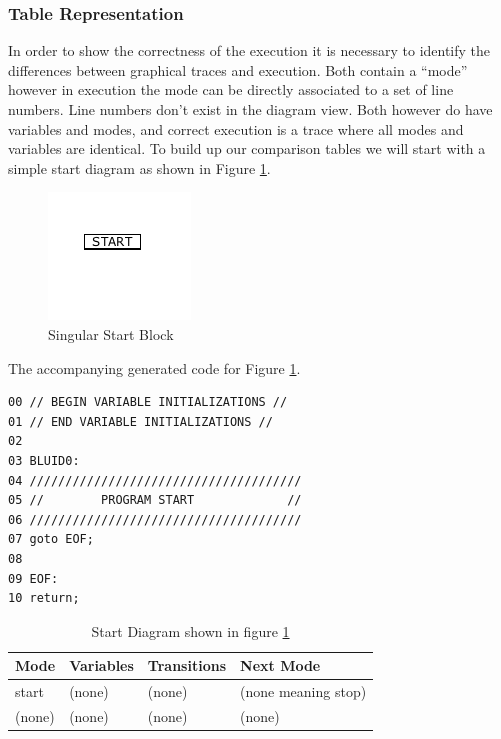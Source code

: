 \subsubsection{Table Representation}

In order to show the correctness of the execution it is necessary to identify the differences between graphical traces and execution. Both contain a ``mode'' however in execution the mode can be directly associated to a set of line numbers. Line numbers don't exist in the diagram view. Both however do have variables and modes, and correct execution is a trace where all modes and variables are identical. To build up our comparison tables we will start with a simple start diagram as shown in Figure \ref{fig:correctness_ex_start}.

\begin{figure}[h]
	\centering
	\includegraphics[width=\imgsmall]{./images/correctness_ex_start.png}
	\caption{Singular Start Block}
	\label{fig:correctness_ex_start}
\end{figure}


The accompanying generated  code for Figure \ref{fig:correctness_ex_start}.

\begin{lstlisting}[frame=single]
00 // BEGIN VARIABLE INITIALIZATIONS //
01 // END VARIABLE INITIALIZATIONS //
02
03 BLUID0:
04 //////////////////////////////////////
05 //        PROGRAM START             //
06 //////////////////////////////////////
07 goto EOF;
08 
09 EOF:
10 return;
\end{lstlisting}

\begin{table}[htcb]
	\caption{Start Diagram shown in figure \ref{fig:correctness_ex_start}}
	\centering
		\begin{tabular}{| l | l | l | l |}
			\hline
			\textbf{Mode} & \textbf{Variables} & \textbf{Transitions} & \textbf{Next Mode} \\
			\hline
			start & (none) & (none) & (none meaning stop) \\
			\hline
			(none) & (none) & (none) & (none) \\
			\hline
		\end{tabular}
	\label{table:BasicDiagOnly}
\end{table}

